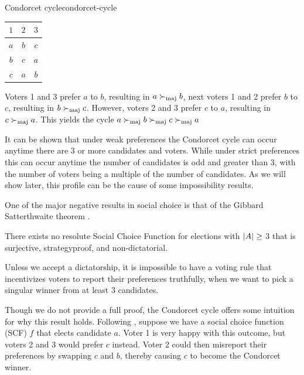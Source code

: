 \begin{example}{Condorcet cycle}{condorcet-cycle}
	\begin{minipage}{0.15\linewidth}
		\begin{tabular}{ccc}
			\toprule
			$1$ & $2$ & $3$  \\
			\midrule
			$a$ & $b$ & $c $ \\
			$b$ & $c$ & $a $ \\
			$c$ & $a$ & $b $ \\
			\bottomrule
		\end{tabular}
	\end{minipage}
	\hspace{0.02\linewidth}
	\begin{minipage}{0.78\linewidth}
		Voters 1 and 3  prefer $a$ to $b$, resulting in $a \succ_{\textnormal{maj}} b$,
		next voters 1 and 2 prefer $b$ to $c$, resulting in $b \succ_{\textnormal{maj}}
			c$. However, voters 2 and 3 prefer $c$ to $a$, resulting in $c
			\succ_{\textnormal{maj}} a$. This yields the cycle $a \succ_{\textnormal{maj}} b \succ_{\textnormal{maj}} c
			\succ_{\textnormal{maj}} a$
	\end{minipage}
\end{example}

It can be shown that under weak preferences the Condorcet
cycle can occur anytime there are 3 or more candidates and voters. While
under strict preferences this can occur anytime the number of candidates is
odd and greater than 3, with the number of voters being a multiple of the
number of candidates. As we will show later, this profile can be the cause of
some impossibility results.

One of the major negative results in social choice is that of the Gibbard
Satterthwaite theorem
\citep{gibbardManipulationVotingSchemes1973,satterthwaiteStrategyproofnessArrowsConditions1975}.

\begin{theorem}
	\label{thm:gs-thm}
	There exists no resolute Social Choice Function for elections with $|A| \geq$ 3 that is surjective, strategyproof, and non-dictatorial.
\end{theorem}

Unless we accept a dictatorship, it is impossible to have a voting
rule that incentivizes voters to report their preferences truthfully, when we
want to pick a singular winner from at least 3 candidates.

Though we do not provide a full proof, the Condorcet cycle offers some
intuition for why this result holds. Following ,
suppose we have a social choice function (SCF) $f$ that elects candidate $a$.
Voter 1 is very happy with this outcome, but voters 2 and 3 would prefer $c$
instead. Voter 2 could then misreport their preferences by swapping $c$ and
$b$, thereby causing $c$ to become the Condorcet winner.


